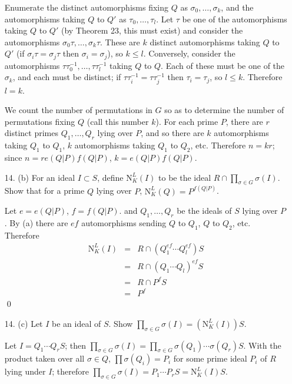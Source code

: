 \documentclass{article}
\newcommand{\norm}[0]{\text{N}}
\begin{document}
\begin{enumerate}
Enumerate the distinct automorphisms fixing $Q$ as $\sigma_0, \ldots, \sigma_k$, and the automorphisms taking $Q$ to $Q'$ as $\tau_0, \ldots, \tau_l$.  Let $\tau$ be one of the automorphisms taking $Q$ to $Q'$ (by Theorem 23, this must exist) and consider the automorphisms $\sigma_0\tau, \ldots, \sigma_k\tau$.  These are $k$ distinct automorphisms taking $Q$ to $Q'$ (if $\sigma_i \tau = \sigma_j \tau$ then $\sigma_i = \sigma_j$), so $k \le l$.  Conversely, consider the automorphisms $\tau \tau_0^{-1}, \ldots, \tau \tau_l^{-1}$ taking $Q$ to $Q$.  Each of these must be one of the $\sigma_{k}$, and each must be distinct; if $\tau \tau_i^{-1} = \tau \tau_j^{-1}$ then $\tau_i = \tau_j$, so $l \le k$.  Therefore $l = k$.

We count the number of permutations in $G$ so as to determine the number of permutations fixing $Q$ (call this number $k$).  For each prime $P$, there are $r$ distinct primes $Q_1, \ldots, Q_r$ lying over $P$, and so there are $k$ automorphisms taking $Q_1$ to $Q_1$, $k$ automorphisms taking $Q_1$ to $Q_2$, etc.  Therefore $n = kr$; since $n = re(Q|P)f(Q|P)$, $k = e(Q|P)f(Q|P)$.

\item[14. (b)] For an ideal $I \subset S$, define $\norm^{L}_{K}(I)$ to be the ideal $R \cap \prod_{\sigma \in G} \sigma(I)$.  Show that for a prime $Q$ lying over $P$, $\norm^{L}_{K}(Q) = P^{f(Q|P)}$.

Let $e = e(Q|P)$, $f = f(Q|P)$. and $Q_1, \ldots, Q_r$ be the ideals of $S$ lying over $P$.  By (a) there are $ef$ automorphisms sending $Q$ to $Q_1$, $Q$ to $Q_2$, etc.  Therefore
\begin{eqnarray*} \norm^{L}_{K}(I) &=& R \cap (Q_1^{ef} \cdots Q_l^{ef})S\\ &=& R \cap (Q_1 \cdots Q_l)^{ef}S \\ &=& R \cap P^{f}S \\ &=& P^{f}\end{eqnarray*}
\qed

\item[14. (c)] Let $I$ be an ideal of $S$.  Show $\prod_{\sigma \in G} \sigma(I) = (\norm^{L}_{K}(I))S$.

Let $I = Q_1 \cdots Q_r S$; then $\prod_{\sigma \in G} \sigma(I) = \prod_{\sigma \in G} \sigma(Q_1)\cdots \sigma(Q_r)S$.  With the product taken over all $\sigma \in Q$, $\prod \sigma(Q_i) = P_i$ for some prime ideal $P_i$ of $R$ lying under $I$; therefore $\prod_{\sigma \in G} \sigma(I) = P_1 \cdots P_r S = \norm^{L}_{K}(I)S$.


\end{enumerate}
\end{document}

